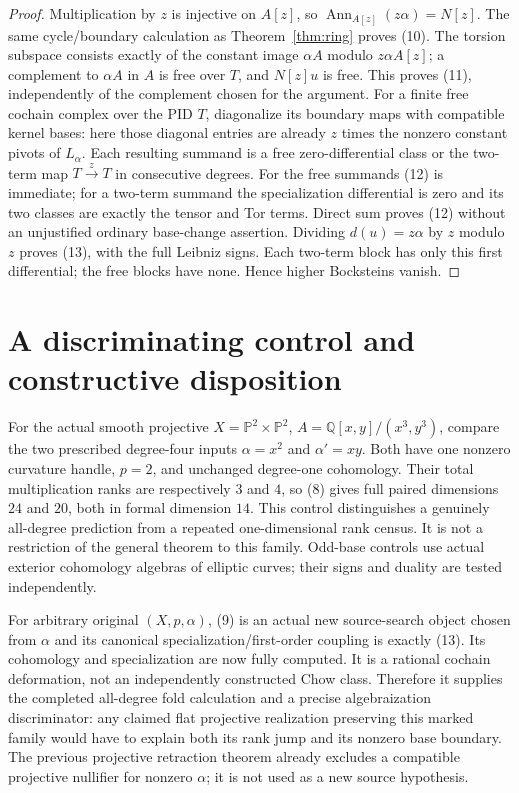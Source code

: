 \documentclass[11pt]{article}
\newcommand{\Q}{\mathbb Q}
\newcommand{\Ann}{\operatorname{Ann}}
\begin{document}
\begin{proof}
Multiplication by $z$ is injective on $A[z]$, so
$\Ann_{A[z]}(z\alpha)=N[z]$. The same cycle/boundary calculation as
Theorem~\ref{thm:ring} proves (10). The torsion subspace consists exactly
of the constant image $\alpha A$ modulo $z\alpha A[z]$; a complement to
$\alpha A$ in $A$ is free over $T$, and $N[z]u$ is free. This proves
(11), independently of the complement chosen for the argument.
For a finite free cochain complex over the PID $T$, diagonalize its
boundary maps with compatible kernel bases: here those diagonal entries
are already $z$ times the nonzero constant pivots of $L_\alpha$.
Each resulting summand is a free zero-differential class or the two-term
map $T\xrightarrow{z}T$ in consecutive degrees. For the free summands
(12) is immediate; for a two-term summand the specialization differential
is zero and its two classes are exactly the tensor and Tor terms. Direct
sum proves (12) without an unjustified ordinary base-change assertion.
Dividing $d(u)=z\alpha$ by $z$ modulo $z$ proves (13), with the full
Leibniz signs. Each two-term block has only this first differential; the
free blocks have none. Hence higher Bocksteins vanish.
\end{proof}

\section{A discriminating control and constructive disposition}
For the actual smooth projective $X=\mathbb P^2\times\mathbb P^2$,
$A=\Q[x,y]/(x^3,y^3)$, compare the two prescribed degree-four inputs
$\alpha=x^2$ and $\alpha'=xy$. Both have one nonzero curvature handle,
$p=2$, and unchanged degree-one cohomology. Their total multiplication
ranks are respectively $3$ and $4$, so (8) gives full paired dimensions
$24$ and $20$, both in formal dimension $14$. This control distinguishes
a genuinely all-degree prediction from a repeated one-dimensional rank
census. It is not a restriction of the general theorem to this family.
Odd-base controls use actual exterior cohomology algebras of elliptic
curves; their signs and duality are tested independently.

For arbitrary original $(X,p,\alpha)$, (9) is an actual new source-search
object chosen from $\alpha$ and its canonical specialization/first-order
coupling is exactly (13). Its cohomology and specialization are now fully
computed. It is a rational cochain deformation, not an independently
constructed Chow class. Therefore it supplies the completed all-degree
fold calculation and a precise algebraization discriminator: any claimed
flat projective realization preserving this marked family would have to
explain both its rank jump and its nonzero base boundary. The previous
projective retraction theorem already excludes a compatible projective
nullifier for nonzero $\alpha$; it is not used as a new source hypothesis.
\end{document}

